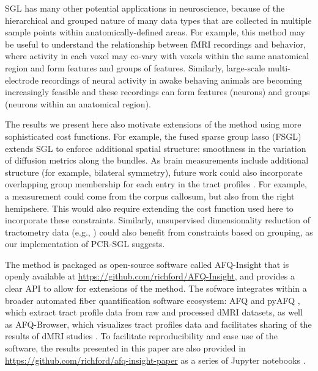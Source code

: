 \documentclass[10pt,letterpaper]{article}
\begin{document}
SGL has many other potential applications in neuroscience, because of the
hierarchical and grouped nature of many data types that are collected in
multiple sample points within anatomically-defined areas. For example, this
method may be useful to understand the relationship between fMRI recordings
and behavior, where activity in each voxel may co-vary with voxels within the
same anatomical region and form features and groups of features. Similarly,
large-scale multi-electrode recordings of neural activity in awake behaving
animals are becoming increasingly feasible \cite{steinmetz2018distributed,
Jun2017-gv} and these recordings can form features (neurons) and groups
(neurons within an anatomical region).

The results we present here also motivate extensions of the method using more
sophisticated cost functions. For example, the fused sparse group lasso
(FSGL) \cite{zhou2012} extends SGL to enforce additional spatial structure:
smoothness in the variation of diffusion metrics along the bundles. As brain
measurements include additional structure (for example, bilateral symmetry),
future work could also incorporate overlapping group membership for each
entry in the tract profiles \cite{Rao2014-xm}. For example, a measurement
could come from the corpus callosum, but also from the right hemipshere. This
would also require extending the cost function used here to incorporate these
constraints. Similarly, unsupervised dimensionality reduction of tractometry
data (e.g., \cite{chamberland2019dimensionality}) could also benefit from constraints
based on grouping, as our implementation of PCR-SGL suggests.

The method is packaged as open-source software called AFQ-Insight that is
openly available at \url{https://github.com/richford/AFQ-Insight}, and
provides a clear API to allow for extensions of the method. The sofware
integrates within a broader automated fiber quantification software
ecosystem: AFQ \cite{yeatman2012tract} and pyAFQ \cite{kruper2021evaluating}, which extract
tract profile data from raw and processed dMRI datasets, as well as
AFQ-Browser, which visualizes tract profiles data and facilitates sharing of the
results of dMRI studies \cite{yeatman2018browser}. To facilitate
reproducibility and ease use of the software, the results presented in this
paper are also provided in
\url{https://github.com/richford/afq-insight-paper} as a series of Jupyter
notebooks \cite{kluyver2016jupyter}.
\end{document}
